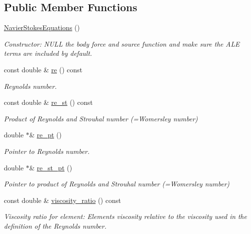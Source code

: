 \subsection*{Public Member Functions}
\begin{DoxyCompactItemize}
\item 
\hyperlink{classoomph_1_1NavierStokesEquations_aee170363c7d480caddfec01a9f785ef4}{Navier\+Stokes\+Equations} ()
\begin{DoxyCompactList}\small\item\em Constructor\+: N\+U\+LL the body force and source function and make sure the A\+LE terms are included by default. \end{DoxyCompactList}\item 
const double \& \hyperlink{classoomph_1_1NavierStokesEquations_ac9d5177e2f6e51509a25c3f794017231}{re} () const
\begin{DoxyCompactList}\small\item\em Reynolds number. \end{DoxyCompactList}\item 
const double \& \hyperlink{classoomph_1_1NavierStokesEquations_a88344305ac612db40cecc6701f094c88}{re\+\_\+st} () const
\begin{DoxyCompactList}\small\item\em Product of Reynolds and Strouhal number (=Womersley number) \end{DoxyCompactList}\item 
double $\ast$\& \hyperlink{classoomph_1_1NavierStokesEquations_a36129d1ac06635d53ed3b0a10d56331f}{re\+\_\+pt} ()
\begin{DoxyCompactList}\small\item\em Pointer to Reynolds number. \end{DoxyCompactList}\item 
double $\ast$\& \hyperlink{classoomph_1_1NavierStokesEquations_a947047c42ccb56e2ecff71357267b98d}{re\+\_\+st\+\_\+pt} ()
\begin{DoxyCompactList}\small\item\em Pointer to product of Reynolds and Strouhal number (=Womersley number) \end{DoxyCompactList}\item 
const double \& \hyperlink{classoomph_1_1NavierStokesEquations_aa250f97466ad1729a5c75c5cd04b0546}{viscosity\+\_\+ratio} () const
\begin{DoxyCompactList}\small\item\em Viscosity ratio for element\+: Element\textquotesingle{}s viscosity relative to the viscosity used in the definition of the Reynolds number. \end{DoxyCompactList}\item 

\end{DoxyCompactItemize}
